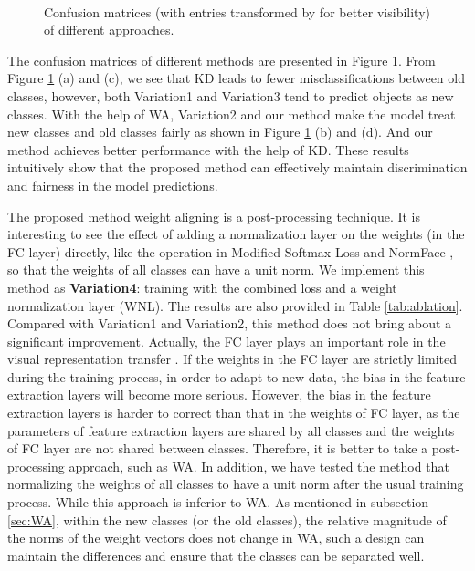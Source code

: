 \documentclass[10pt,twocolumn,letterpaper]{article}
\begin{document}
\begin{figure}[t]
  \centering
  \hspace{5mm}
  \hspace{5mm}\\ \vspace{-3mm}
  \hspace{5mm}
  \caption{Confusion matrices (with entries transformed by  for better visibility) of different approaches.}
  \label{fig:confusion}
\end{figure}

The confusion matrices of different methods are presented in Figure \ref{fig:confusion}. From Figure \ref{fig:confusion} (a) and (c), we see that KD leads to fewer misclassifications between old classes, however, both Variation1 and Variation3 tend to predict objects as new classes. With the help of WA, Variation2 and our method make the model treat new classes and old classes fairly as shown in Figure \ref{fig:confusion} (b) and (d). And our method achieves better performance with the help of KD. These results intuitively show that the proposed method can effectively maintain discrimination and fairness in the model predictions.

The proposed method weight aligning is a post-processing technique. It is interesting to see the effect of adding a normalization layer on the weights (in the FC layer) directly, like the operation in Modified Softmax Loss \cite{Liu2017SphereFaceDH} and NormFace \cite{Wang2017NormFaceLH}, so that the weights of all classes can have a unit norm. We implement this method as \textbf{Variation4}: training with the combined loss and a weight normalization layer (WNL). The results are also provided in Table \ref{tab:ablation}. Compared with Variation1 and Variation2, this method does not bring about a significant improvement. Actually, the FC layer plays an important role in the visual representation transfer \cite{Zhang2017InDO}. If the weights in the FC layer are strictly limited during the training process, in order to adapt to new data, the bias in the feature extraction layers will become more serious. However, the bias in the feature extraction layers is harder to correct than that in the weights of FC layer, as the parameters of feature extraction layers are shared by all classes and the weights of FC layer are not shared between classes. Therefore, it is better to take a post-processing approach, such as WA. In addition, we have tested the method that normalizing the weights of all classes to have a unit norm after the usual training process. While this approach is inferior to WA. As mentioned in subsection \ref{sec:WA}, within the new classes (or the old classes), the relative magnitude of the norms of the weight vectors does not change in WA, such a design can maintain the differences and ensure that the classes can be separated well.
\end{document}

